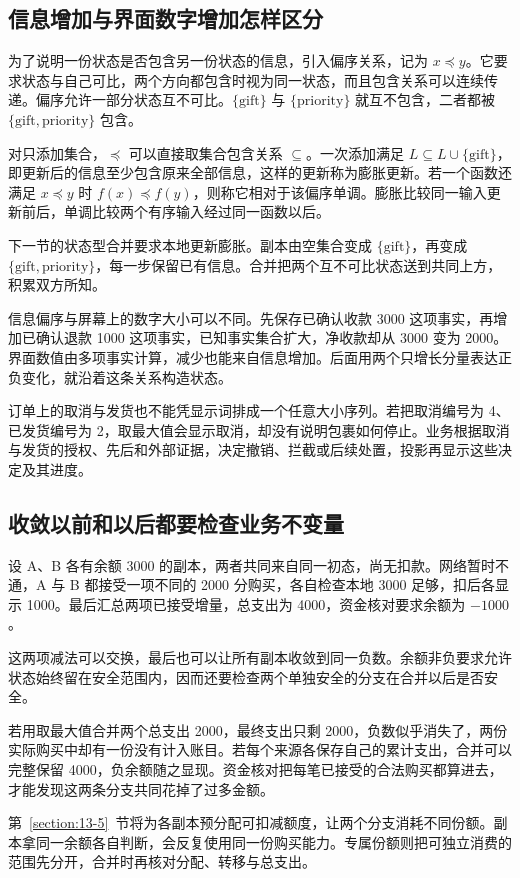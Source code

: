 \subsection*{信息增加与界面数字增加怎样区分}

为了说明一份状态是否包含另一份状态的信息，引入偏序关系，记为 $x\preceq y$。它要求状态与自己可比，两个方向都包含时视为同一状态，而且包含关系可以连续传递。偏序允许一部分状态互不可比。$\{\mathrm{gift}\}$ 与 $\{\mathrm{priority}\}$ 就互不包含，二者都被 $\{\mathrm{gift},\mathrm{priority}\}$ 包含。

对只添加集合，$\preceq$ 可以直接取集合包含关系 $\subseteq$。一次添加满足 $L\subseteq L\cup\{\mathrm{gift}\}$，即更新后的信息至少包含原来全部信息，这样的更新称为膨胀更新。若一个函数还满足 $x\preceq y$ 时 $f(x)\preceq f(y)$，则称它相对于该偏序单调。膨胀比较同一输入更新前后，单调比较两个有序输入经过同一函数以后。

下一节的状态型合并要求本地更新膨胀。副本由空集合变成 $\{\mathrm{gift}\}$，再变成 $\{\mathrm{gift},\mathrm{priority}\}$，每一步保留已有信息。合并把两个互不可比状态送到共同上方，积累双方所知。


信息偏序与屏幕上的数字大小可以不同。先保存已确认收款 3000 这项事实，再增加已确认退款 1000 这项事实，已知事实集合扩大，净收款却从 3000 变为 2000。界面数值由多项事实计算，减少也能来自信息增加。后面用两个只增长分量表达正负变化，就沿着这条关系构造状态。

订单上的取消与发货也不能凭显示词排成一个任意大小序列。若把取消编号为 4、已发货编号为 2，取最大值会显示取消，却没有说明包裹如何停止。业务根据取消与发货的授权、先后和外部证据，决定撤销、拦截或后续处置，投影再显示这些决定及其进度。

\subsection*{收敛以前和以后都要检查业务不变量}

设 A、B 各有余额 3000 的副本，两者共同来自同一初态，尚无扣款。网络暂时不通，A 与 B 都接受一项不同的 2000 分购买，各自检查本地 3000 足够，扣后各显示 1000。最后汇总两项已接受增量，总支出为 4000，资金核对要求余额为 $-1000$。

这两项减法可以交换，最后也可以让所有副本收敛到同一负数。余额非负要求允许状态始终留在安全范围内，因而还要检查两个单独安全的分支在合并以后是否安全。


若用取最大值合并两个总支出 2000，最终支出只剩 2000，负数似乎消失了，两份实际购买中却有一份没有计入账目。若每个来源各保存自己的累计支出，合并可以完整保留 4000，负余额随之显现。资金核对把每笔已接受的合法购买都算进去，才能发现这两条分支共同花掉了过多金额。

第~\ref{section:13-5}~节将为各副本预分配可扣减额度，让两个分支消耗不同份额。副本拿同一余额各自判断，会反复使用同一份购买能力。专属份额则把可独立消费的范围先分开，合并时再核对分配、转移与总支出。
\FloatBarrier
